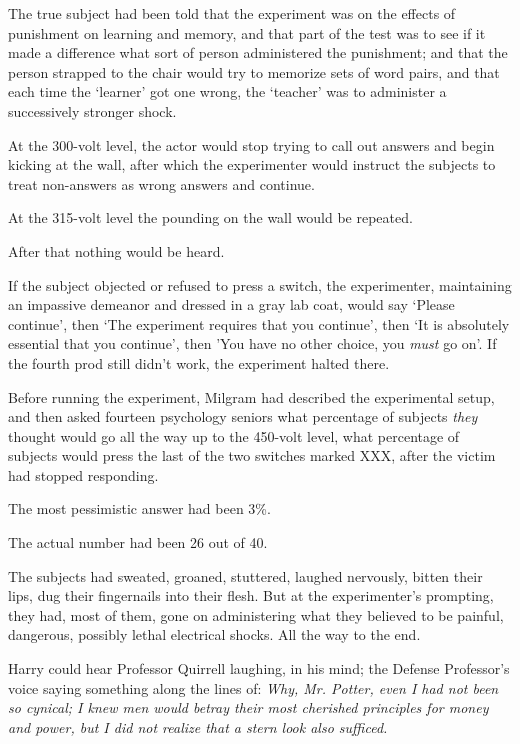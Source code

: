 The true subject had been told that the experiment was on the effects of
punishment on learning and memory, and that part of the test was to see
if it made a difference what sort of person administered the punishment;
and that the person strapped to the chair would try to memorize sets of
word pairs, and that each time the `learner' got one wrong, the
`teacher' was to administer a successively stronger shock.

At the 300-volt level, the actor would stop trying to call out answers
and begin kicking at the wall, after which the experimenter would
instruct the subjects to treat non-answers as wrong answers and
continue.

At the 315-volt level the pounding on the wall would be repeated.

After that nothing would be heard.

If the subject objected or refused to press a switch, the experimenter,
maintaining an impassive demeanor and dressed in a gray lab coat, would
say `Please continue', then `The experiment requires that you continue',
then `It is absolutely essential that you continue', then 'You have no
other choice, you \emph{must} go on'. If the fourth prod still didn't
work, the experiment halted there.

Before running the experiment, Milgram had described the experimental
setup, and then asked fourteen psychology seniors what percentage of
subjects \emph{they} thought would go all the way up to the 450-volt
level, what percentage of subjects would press the last of the two
switches marked XXX, after the victim had stopped responding.

The most pessimistic answer had been 3\%.

The actual number had been 26 out of 40.

The subjects had sweated, groaned, stuttered, laughed nervously, bitten
their lips, dug their fingernails into their flesh. But at the
experimenter's prompting, they had, most of them, gone on administering
what they believed to be painful, dangerous, possibly lethal electrical
shocks. All the way to the end.

Harry could hear Professor Quirrell laughing, in his mind; the Defense
Professor's voice saying something along the lines of: \emph{Why, Mr.
Potter, even I had not been so cynical; I knew men would betray their
most cherished principles for money and power, but I did not realize
that a stern look also sufficed.}

